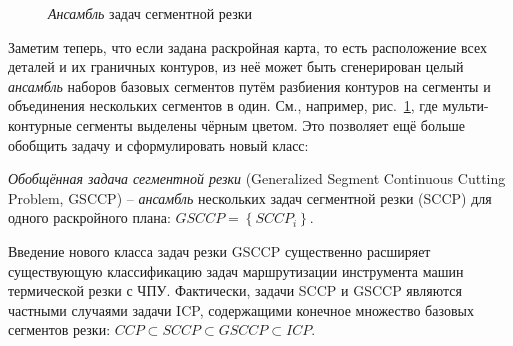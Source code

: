 \documentclass[10pt]{SPIIRAS_Proceedings}
\begin{document}
\begin{figure}
  \centering
  \caption{{\it Ансамбль} задач сегментной резки}
  \label{fig:gsccp}
\end{figure}

Заметим теперь,
что если задана раскройная карта,
то есть расположение всех деталей и их
граничных контуров,
из неё может быть сгенерирован
целый {\it ансамбль}
наборов базовых сегментов
путём разбиения контуров на сегменты
и объединения нескольких сегментов в один.
См., например,
рис.~\ref{fig:gsccp},
где мульти-контурные сегменты выделены
чёрным цветом.
Это позволяет ещё больше обобщить задачу
и сформулировать новый класс:

{\it Обобщённая задача сегментной резки}
(Generalized Segment Continuous Cutting Problem, GSCCP)
-- {\it ансамбль} нескольких задач сегментной резки
(SCCP)
для одного раскройного плана:
$GSCCP = \left\{ SCCP_i \right\}$.

Введение нового класса задач резки GSCCP
существенно расширяет существующую классификацию
задач маршрутизации инструмента машин термической резки с ЧПУ.
Фактически,
задачи SCCP и GSCCP
являются частными случаями задачи ICP,
содержащими конечное множество базовых
сегментов резки:
$ CCP \subset SCCP \subset GSCCP \subset ICP$.
\end{document}
